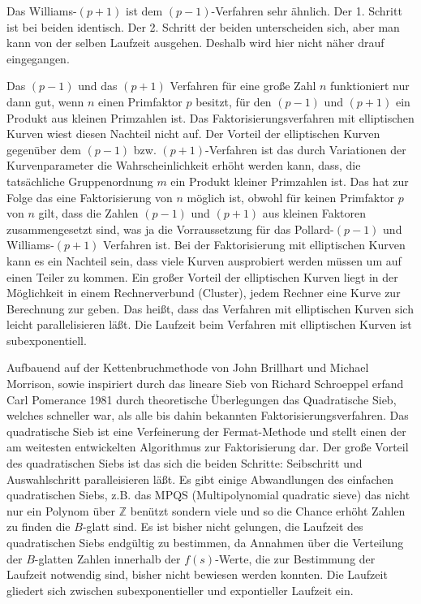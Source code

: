 \documentclass[10pt, bigheadings]{scrartcl}
\begin{document}
Das Williams-$(p+1)$ ist dem $(p-1)$-Verfahren sehr ähnlich. Der 1. Schritt
ist bei beiden identisch. Der 2. Schritt der beiden unterscheiden sich, aber
man kann von der selben Laufzeit ausgehen. Deshalb wird hier nicht näher drauf
eingegangen.

Das $(p-1)$ und das $(p+1)$ Verfahren für eine große Zahl $n$ funktioniert
nur dann gut, wenn $n$ einen Primfaktor $p$ besitzt, für den $(p-1)$ und $(p+1)$
ein Produkt aus kleinen Primzahlen ist. Das Faktorisierungsverfahren mit 
elliptischen Kurven wiest diesen Nachteil nicht auf. Der Vorteil
der elliptischen Kurven gegenüber dem $(p-1)$ bzw. $(p+1)$-Verfahren ist das
durch Variationen der Kurvenparameter die Wahrscheinlichkeit erhöht werden kann,
 dass, die tatsächliche Gruppenordnung $m$ ein Produkt kleiner Primzahlen ist. 
Das hat zur Folge das eine Faktorisierung von $n$ möglich ist, obwohl für 
keinen Primfaktor $p$ von $n$ gilt, dass die Zahlen $(p-1)$ und $(p+1)$ aus 
kleinen Faktoren zusammengesetzt sind, was ja die Vorraussetzung für das 
Pollard-$(p-1)$ und Williams-$(p+1)$ Verfahren ist. Bei der Faktorisierung mit 
elliptischen Kurven kann es ein Nachteil sein, dass viele
Kurven ausprobiert werden müssen um auf einen Teiler zu kommen. 
Ein großer Vorteil der elliptischen
Kurven liegt in der Möglichkeit in einem Rechnerverbund (Cluster), jedem Rechner
eine Kurve zur Berechnung zur geben. Das heißt, dass das Verfahren mit
elliptischen Kurven sich leicht parallelisieren läßt. Die Laufzeit beim 
Verfahren mit elliptischen Kurven ist subexponentiell.


Aufbauend auf der Kettenbruchmethode von John Brillhart und Michael Morrison,
sowie inspiriert durch das lineare Sieb von Richard Schroeppel erfand Carl
Pomerance 1981 durch theoretische Überlegungen das Quadratische Sieb, welches
schneller war, als alle bis dahin bekannten Faktorisierungsverfahren.
Das quadratische Sieb ist eine Verfeinerung der Fermat-Methode und stellt einen
der am weitesten entwickelten Algorithmus zur Faktorisierung dar. Der große
Vorteil des quadratischen Siebs ist das sich die beiden Schritte: Seibschritt
und Auswahlschritt paralleisieren läßt. Es gibt einige Abwandlungen des einfachen
quadratischen Siebs, z.B. das MPQS (Multipolynomial quadratic sieve) das nicht nur
ein Polynom über $\mathbb Z$ benützt sondern viele und so die Chance erhöht
Zahlen zu finden die $B$-glatt sind. Es ist bisher nicht gelungen, die
Laufzeit des quadratischen Siebs endgültig zu bestimmen, da Annahmen über die
Verteilung der $B$-glatten Zahlen innerhalb der $f(s)$-Werte,
die zur Bestimmung der Laufzeit notwendig sind, bisher nicht
bewiesen werden konnten. Die Laufzeit gliedert sich zwischen subexponentieller
und expontieller Laufzeit ein.
\end{document}
